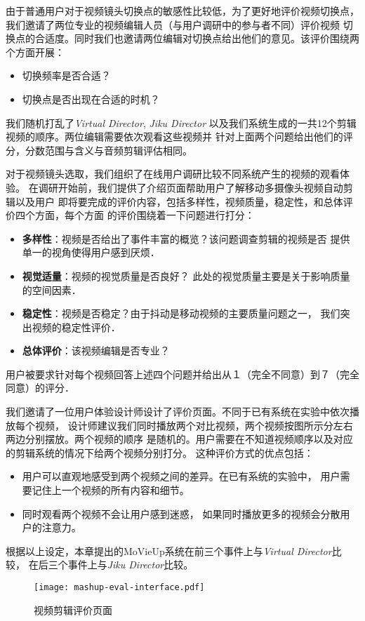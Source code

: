 由于普通用户对于视频镜头切换点的敏感性比较低，为了更好地评价视频切换点，
我们邀请了两位专业的视频编辑人员（与用户调研中的参与者不同）评价视频
切换点的合适度。同时我们也邀请两位编辑对切换点给出他们的意见。该评价围绕两个方面开展：
\begin{itemize}
    \item 切换频率是否合适？
    \item 切换点是否出现在合适的时机？
\end{itemize}
我们随机打乱了\emph{Virtual Director}, \emph{Jiku Director}
以及我们系统生成的一共12个剪辑视频的顺序。两位编辑需要依次观看这些视频并
针对上面两个问题给出他们的评分，分数范围与含义与音频剪辑评估相同。

对于视频镜头选取，我们组织了在线用户调研比较不同系统产生的视频的观看体验。
在调研开始前，我们提供了介绍页面帮助用户了解移动多摄像头视频自动剪辑以及用户
即将要完成的评价内容，包括多样性，视频质量，稳定性，和总体评价四个方面，每个方面
的评价围绕着一下问题进行打分：
\begin{itemize}
    \item \textbf{多样性}：视频是否给出了事件丰富的概览？该问题调查剪辑的视频是否
        提供单一的视角使得用户感到厌烦．
    \item \textbf{视觉适量}：视频的视觉质量是否良好？
        此处的视觉质量主要是关于影响质量的空间因素．
    \item \textbf{稳定性}：视频是否稳定？由于抖动是移动视频的主要质量问题之一，
        我们突出视频的稳定性评价．
    \item \textbf{总体评价}：该视频编辑是否专业？
\end{itemize}
用户被要求针对每个视频回答上述四个问题并给出从１（完全不同意）到７（完全同意）的评分．

我们邀请了一位用户体验设计师设计了评价页面。不同于已有系统在实验中依次播放每个视频，
设计师建议我们同时播放两个对比视频，两个视频按图所示分左右两边分别摆放。两个视频的顺序
是随机的。用户需要在不知道视频顺序以及对应的剪辑系统的情况下给两个视频分别打分。
这种评价方式的优点包括：
\begin{itemize}
    \item 用户可以直观地感受到两个视频之间的差异。在已有系统的实验中，
        用户需要记住上一个视频的所有内容和细节。
    \item 同时观看两个视频不会让用户感到迷惑，
        如果同时播放更多的视频会分散用户的注意力。
\end{itemize}
根据以上设定，本章提出的MoVieUp系统在前三个事件上与\emph{Virtual Director}比较，
在后三个事件上与\emph{Jiku Director}比较。
\begin{figure}[ht]
    \centering
    \texttt{[image: mashup-eval-interface.pdf]}
    \caption{视频剪辑评价页面}
    \label{fig:mashup-eval-interface}
\end{figure}

